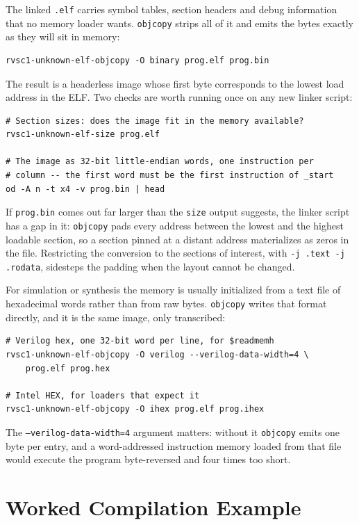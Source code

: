 The linked \texttt{.elf} carries symbol tables, section headers and debug information that no
memory loader wants. \texttt{objcopy} strips all of it and emits the bytes exactly as they will sit
in memory:

\begin{lstlisting}
rvsc1-unknown-elf-objcopy -O binary prog.elf prog.bin
\end{lstlisting}

The result is a headerless image whose first byte corresponds to the lowest load address in the
ELF. Two checks are worth running once on any new linker script:

\begin{lstlisting}
# Section sizes: does the image fit in the memory available?
rvsc1-unknown-elf-size prog.elf

# The image as 32-bit little-endian words, one instruction per
# column -- the first word must be the first instruction of _start
od -A n -t x4 -v prog.bin | head
\end{lstlisting}

If \nolinkurl{prog.bin} comes out far larger than the \texttt{size} output suggests, the linker
script has a gap in it: \texttt{objcopy} pads every address between the lowest and the highest
loadable section, so a section pinned at a distant address materializes as zeros in the file.
Restricting the conversion to the sections of interest, with \texttt{-j .text -j .rodata},
sidesteps the padding when the layout cannot be changed.

For simulation or synthesis the memory is usually initialized from a text file of hexadecimal
words rather than from raw bytes. \texttt{objcopy} writes that format directly, and it is the same
image, only transcribed:

\begin{lstlisting}
# Verilog hex, one 32-bit word per line, for $readmemh
rvsc1-unknown-elf-objcopy -O verilog --verilog-data-width=4 \
    prog.elf prog.hex

# Intel HEX, for loaders that expect it
rvsc1-unknown-elf-objcopy -O ihex prog.elf prog.ihex
\end{lstlisting}

The \texttt{--verilog-data-width=4} argument matters: without it \texttt{objcopy} emits one byte
per entry, and a word-addressed instruction memory loaded from that file would execute the program
byte-reversed and four times too short.


\chapter{Worked Compilation Example} \label{apx:example}

